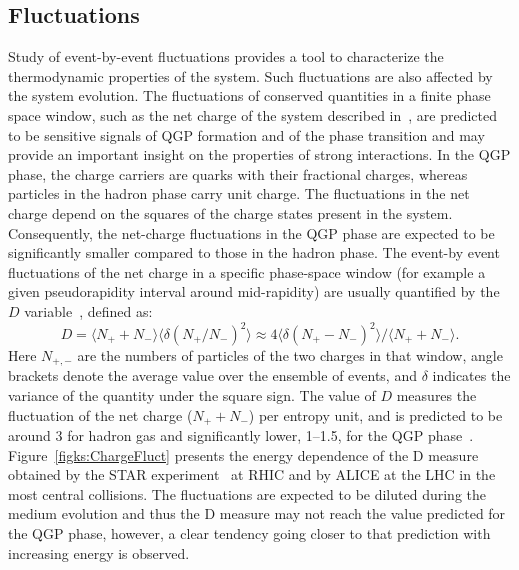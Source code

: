 \subsection{Fluctuations}
\label{subsecks:fluct}
Study of event-by-event fluctuations provides a tool to characterize the thermodynamic properties of the system. Such fluctuations are also affected by the system evolution. The fluctuations of conserved quantities in a finite phase space window, such as the net charge of the system described in~\cite{Abelev:2012pv}, are predicted to be sensitive signals of QGP formation and of the phase transition and may provide an important insight on the properties of strong interactions. In the QGP phase, the charge carriers are quarks with their fractional charges, whereas particles in the hadron phase carry unit charge. The fluctuations in the net charge depend on the squares of the charge states present in the system. Consequently, the net-charge fluctuations in the QGP phase are expected to be significantly smaller compared to those in the hadron phase. The event-by event fluctuations of the net charge in a specific phase-space window (for example a given pseudorapidity interval around mid-rapidity) are usually quantified by the $D$ variable~\cite{Jeon:2000wg}, defined as:
\begin{equation}
D = \langle N_{+} + N_{-} \rangle \langle \delta (N_{+} / N_{-})^2 \rangle \approx 4 \langle \delta (N_{+} - N_{-})^2 \rangle / \langle N_{+} + N_{-} \rangle .
\end{equation}
Here $N_{+,-}$ are the numbers of particles of the two charges in that window, angle brackets denote the average value over the ensemble of events, and $\delta$ indicates the variance of the quantity under the square sign. The value of $D$ measures the fluctuation of the net charge ($N_{+} + N_{-}$) per entropy unit, and is predicted to be around 3 for hadron gas and significantly lower, 1--1.5, for the QGP phase~\cite{Jeon:2003gk}. Figure~\ref{figks:ChargeFluct} presents the energy dependence of the D measure obtained by the STAR experiment~\cite{Abelev:2008jg} at RHIC and by ALICE at the LHC in the most central collisions. The fluctuations are expected to be diluted during the medium evolution and thus the D measure may not reach the value predicted for the QGP phase, however, a clear tendency going closer to that prediction with increasing energy is observed.

